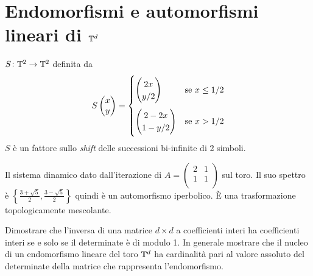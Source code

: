 \section{Endomorfismi e automorfismi lineari di $ \mathbb{T}^d $}
\begin{example}
    $ S \colon \mathbb{T}^2 \to \mathbb{T}^2 $ definita da
    \begin{equation*}
        S
        \begin{pmatrix}
            x \\
            y
        \end{pmatrix}
        =
        \begin{cases}
            \begin{pmatrix}
                2x \\
                y/2
            \end{pmatrix}
            & \text{se $ x \leq 1/2 $} \\[1.5em]
            \begin{pmatrix}
                2 - 2x \\
                1 - y/2
            \end{pmatrix}
            & \text{se $ x > 1/2 $}
        \end{cases}
    \end{equation*}
    $ S $ è un fattore sullo \emph{shift} delle successioni bi-infinite di 2 simboli.
\end{example}

\begin{example}
    Il sistema dinamico dato dall'iterazione di $ A = \begin{pmatrix} 2 & 1 \\ 1 & 1 \\\end{pmatrix} $ sul toro. Il suo spettro è $     \left\{\frac{3+\sqrt{5}}{2}, \frac{3-\sqrt{5}}{2}\right\} $ quindi è un automorfismo iperbolico. È una trasformazione topologicamente mescolante.
\end{example}

\begin{exercise}
    Dimostrare che l’inversa di una matrice $ d \times d $ a coefficienti interi ha coefficienti interi se e solo se il determinate è di modulo 1. In generale mostrare che il nucleo di un endomorfismo lineare del toro $ \mathbb{T}^d $ ha cardinalità pari al valore assoluto del determinate della matrice che rappresenta l'endomorfismo.
\end{exercise}

